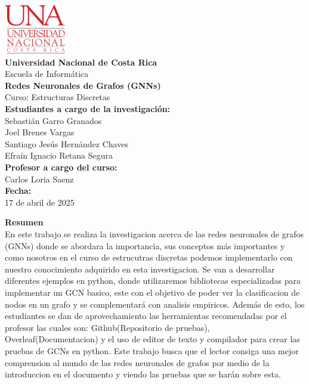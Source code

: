 \documentclass[11pt]{article} %
\begin{document}
\begin{titlepage}
    \thispagestyle{empty}
    \begin{spacing}{1.5}
    \begin{center}
        \includegraphics[width=0.2\textwidth]{Images/LogoUNA.svg.png} \\[30pt]
        {\Large \textbf{Universidad Nacional de Costa Rica}} \\[20pt] 
        {\Large Escuela de Informática} \\[20pt]
        {\Large \textbf{Redes Neuronales de Grafos (GNNs)}} \\[20pt]
        {\Large Curso: Estructuras Discretas} \\[20pt]
        {\Large \textbf{Estudiantes a cargo de la investigación:}} \\[10pt]
        {\large Sebastián Garro Granados \\ Joel Brenes Vargas \\ Santiago Jesús Hernández Chaves \\ Efraín Ignacio Retana Segura} \\[20pt]
        {\Large \textbf{Profesor a cargo del curso:}} \\[15pt]
        {\large Carlos Loria Saenz} \\[120pt]
        {\Large \textbf{Fecha:}} \\[15pt]
        {\large 17 de abril de 2025}
    \end{center}
    \end{spacing}
\end{titlepage}

\newpage
\thispagestyle{empty}
{\large \textbf{Resumen}} \\[5pt]

En este trabajo se realiza la investigacion acerca de las redes neuronales de grafos (GNNs) donde se abordara la importancia, sus conceptos más importantes y como nosotros en el curso de estrucutras discretas podemos implementarlo con nuestro conocimiento adquirido en esta investigacion. Se van a desarrollar diferentes ejemplos en python, donde utilizaremos bibliotecas especializadas para implementar un GCN basico, este con el objetivo de poder ver la clasificacion de nodos en un grafo y se complementará con analisis empiricos. Además de esto, los estudiantes se dan de aprovechamiento las herramientas recomendadas por el profesor las cuales son: Github(Repositorio de pruebas), Overleaf(Documentacion) y el uso de editor de texto y compilador para crear las pruebas de GCNs en python. Este trabajo busca que el lector consiga una mejor comprension al mundo de las redes neuronales de grafos por medio de la introduccion en el documento y viendo las pruebas que se harán sobre esta. %
\end{document}
